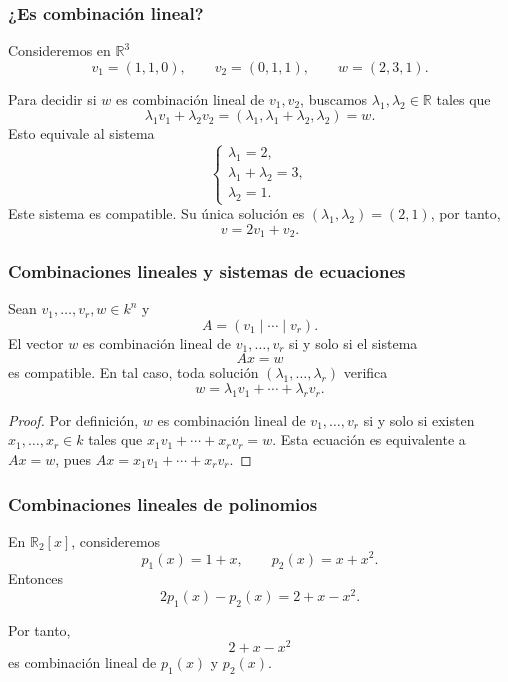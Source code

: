\begin{frame}
    \frametitle{¿Es combinación lineal?}

        Consideremos en \(\mathbb{R}^3\)
        \[
            v_1=(1,1,0),
            \qquad
            v_2=(0,1,1),
            \qquad
            w=(2,3,1).
        \]

        Para decidir si \(w\) es combinación lineal de \(v_1,v_2\),
        buscamos \(\lambda_1,\lambda_2\in\mathbb{R}\) tales que
        \[
            \lambda_1v_1+\lambda_2v_2=(\lambda_1, \lambda_1+ \lambda_2, \lambda_2)=w.
        \]
        Esto equivale al sistema
        \[
            \begin{cases}
                \lambda_1=2,\\
                \lambda_1+\lambda_2=3,\\
                \lambda_2=1.
            \end{cases}
        \]
        Este sistema es compatible. Su única solución es $(\lambda_1,\lambda_2)=(2,1)$, por tanto,
        \[
            v=2v_1+v_2.
        \]

\end{frame}



\begin{frame}
    \frametitle{Combinaciones lineales y sistemas de ecuaciones}

    \begin{proposition}
        Sean $v_1,\ldots,v_r,w\in k^n$ y \[A=(v_1\mid\cdots\mid v_r).\]
        El vector $w$ es combinación lineal de $v_1,\ldots,v_r$ si y solo si
        el sistema \[Ax=w\] es compatible.
        En tal caso, toda solución $(\lambda_1,\ldots,\lambda_r)$ 
        verifica \[w=\lambda_1v_1+\cdots+\lambda_rv_r.\]
    \end{proposition}
    
    \vspace{-10pt}

    \begin{proof}
        Por definición, $w$ es combinación lineal de $v_1,\ldots,v_r$
        si y solo si existen $x_1,\ldots,x_r\in k$ tales que
        $x_1v_1+\cdots+x_rv_r=w$.
        Esta ecuación es equivalente a $Ax=w$,
        pues $Ax=x_1v_1+\cdots+x_rv_r$.
    \end{proof}
\end{frame}


\begin{frame}
    \frametitle{Combinaciones lineales de polinomios}

    \begin{example}
        En \(\mathbb{R}_2[x]\), consideremos
        \[
            p_1(x)=1+x,
            \qquad
            p_2(x)=x+x^2.
        \]
        Entonces
        \[
            2p_1(x)-p_2(x)
            =
            2+x-x^2.
        \]

        Por tanto,
        \[
            2+x-x^2
        \]
        es combinación lineal de \(p_1(x)\) y \(p_2(x)\).
    \end{example}

\end{frame}


